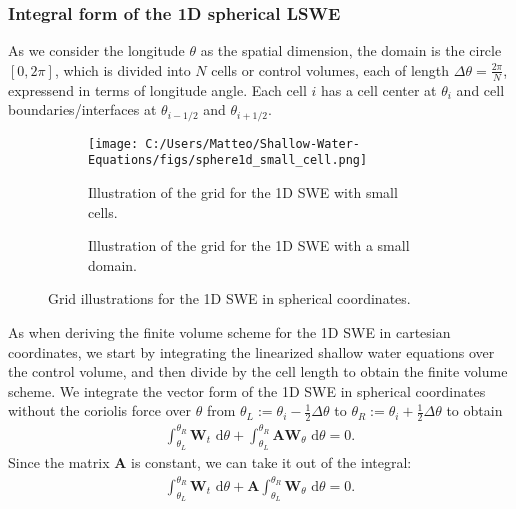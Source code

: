 \subsubsection*{Integral form of the 1D spherical LSWE}
As we consider the longitude $\theta$ as the spatial dimension, the domain is the circle $[0, 2\pi]$, which is divided into $N$ cells or control volumes, each of length $\Delta \theta = \frac{2\pi}{N}$, expressend in terms of longitude angle.
Each cell $i$ has a cell center at $\theta_i$ and cell boundaries/interfaces at $\theta_{i-1/2}$ and $\theta_{i+1/2}$.
\begin{figure}[H]
    \centering
    \begin{subfigure}{0.4\textwidth}
        \centering
        \texttt{[image: C:/Users/Matteo/Shallow-Water-Equations/figs/sphere1d\_small\_cell.png]}
        \caption{Illustration of the grid for the 1D SWE with small cells.}\label{fig:sphere1d_small_cell}
    \end{subfigure}%
    \begin{subfigure}{0.35\textwidth}
        \centering
        \caption{Illustration of the grid for the 1D SWE with a small domain.}\label{fig:sphere1d_small_domain}
    \end{subfigure}
    \caption{Grid illustrations for the 1D SWE in spherical coordinates.}\label{fig:sphere1d_combined}
\end{figure}
As when deriving the finite volume scheme for the 1D SWE in cartesian coordinates, we start by integrating the linearized shallow water equations over the control volume, and then divide by the cell length to obtain the finite volume scheme.
We integrate the vector form of the 1D SWE in spherical coordinates without the coriolis force over $\theta$ from $\theta_L := \theta_i - \frac{1}{2} \Delta \theta $ to $\theta_R := \theta_i + \frac{1}{2}\Delta \theta $ to obtain
\begin{align*}
    \int_{\theta_L}^{\theta_R} \mathbf{W}_t \text{ d}\theta + \int_{\theta_L}^{\theta_R} \mathbf{A} \mathbf{W}_\theta \text{ d}\theta = 0.
\end{align*}
Since the matrix $\mathbf{A}$ is constant, we can take it out of the integral:
\begin{align*}
    \int_{\theta_L}^{\theta_R} \mathbf{W}_t \text{ d}\theta + \mathbf{A} \int_{\theta_L}^{\theta_R} \mathbf{W}_\theta \text{ d}\theta = 0.
\end{align*}
